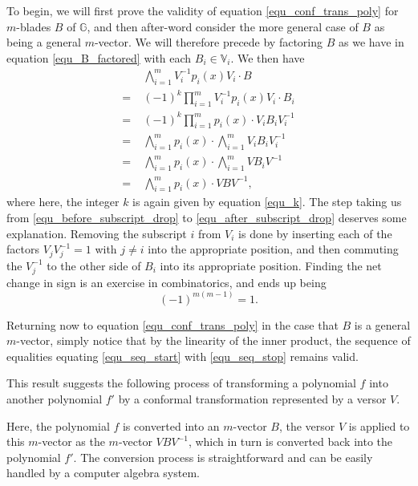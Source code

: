\documentclass{ecgd-l}
\theoremstyle{definition}
\theoremstyle{remark}
\numberwithin{equation}{section}
\newcommand{\G}{\mathbb{G}}
\newcommand{\V}{\mathbb{V}}
\begin{document}
To begin, we will first prove the validity of equation \eqref{equ_conf_trans_poly} for $m$-blades $B$ of $\G$,
and then after-word consider the more general case of $B$ as being a general $m$-vector.
We will therefore precede by factoring $B$ as we have in equation \eqref{equ_B_factored}
with each $B_i\in\V_i$.  We then have
\begin{align}
 & \bigwedge_{i=1}^m V_i^{-1}p_i(x)V_i\cdot B\label{equ_seq_start} \\
=\;& (-1)^k\prod_{i=1}^m V_i^{-1}p_i(x)V_i\cdot B_i\nonumber \\
=\;& (-1)^k\prod_{i=1}^m p_i(x)\cdot V_iB_iV_i^{-1}\nonumber \\
=\;&\bigwedge_{i=1}^m p_i(x)\cdot\bigwedge_{i=1}^m V_iB_iV_i^{-1}\label{equ_before_subscript_drop} \\
=\;&\bigwedge_{i=1}^m p_i(x)\cdot\bigwedge_{i=1}^m VB_iV^{-1}\label{equ_after_subscript_drop} \\
=\;&\bigwedge_{i=1}^m p_i(x)\cdot VBV^{-1},\label{equ_seq_stop}
\end{align}
where here, the integer $k$ is again given by equation \eqref{equ_k}.  The step taking us from
\eqref{equ_before_subscript_drop} to \eqref{equ_after_subscript_drop} deserves some explanation.
Removing the subscript $i$ from $V_i$ is done by inserting each of the factors $V_jV_j^{-1}=1$ with $j\neq i$
into the appropriate position, and then
commuting the $V_j^{-1}$ to the other side of $B_i$ into its appropriate position.  Finding the net change in sign
is an exercise in combinatorics, and ends up being
\begin{equation*}
(-1)^{m(m-1)}=1.
\end{equation*}

Returning now to equation \eqref{equ_conf_trans_poly} in the case that $B$ is a general $m$-vector, simply notice
that by the linearity of the inner product, the sequence of equalities equating \eqref{equ_seq_start} with \eqref{equ_seq_stop} remains valid.

This result suggests the following process of transforming a polynomial $f$ into another polynomial $f'$ by a conformal
transformation represented by a versor $V$.
\begin{center}
\end{center}
Here, the polynomial $f$ is converted into an $m$-vector $B$, the versor $V$ is applied to this $m$-vector
as the $m$-vector $VBV^{-1}$, which in turn is converted back into the polynomial $f'$.  The conversion
process is straightforward and can be easily handled by a computer algebra system.
\end{document}
